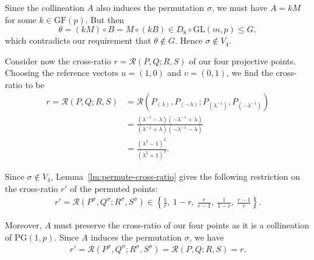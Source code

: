 \documentclass[ALCO, Unicode]{cedram}
\newcommand{\GF}{\mathrm{GF}}
\newcommand{\GL}{\mathrm{GL}}
\newcommand{\PG}{\mathrm{PG}}
\begin{document}
Since the collineation $A$ also induces the permutation $\sigma$, we must have $A = kM$ for some $k \in \GF{\left(p \right)}$. But then
\begin{displaymath}
\theta = \left(kM \right) \circ B = M \circ \left(kB \right) \in D_8 \circ \GL{\left(m, p \right)} \leqslant G,
\end{displaymath}
which contradicts our requirement that $\theta \notin G$. Hence $\sigma \notin V_4$.

Consider now the cross-ratio $r = \mathcal{R}{\left(P, Q; R, S \right)}$ of our four projective points. Choosing the reference vectors $u = \left(1, 0 \right)$ and $v = \left(0, 1 \right)$, we find the cross-ratio to be
\begin{align*}
r = \mathcal{R}{\left(P, Q; R, S \right)} &= \mathcal{R}{\left(P_{\left(\lambda \right)}, P_{\left(-\lambda \right)}; P_{\left(\lambda^{-1} \right)}, P_{\left(-\lambda^{-1} \right)}\right)} \\
&= \frac{\left(\lambda^{-1} - \lambda \right) \left(-\lambda^{-1} + \lambda \right)}{\left(\lambda^{-1} + \lambda \right) \left(-\lambda^{-1} - \lambda \right)} \\
&= \frac{\left(\lambda^2 - 1 \right)^2}{\left(\lambda^2 + 1 \right)^2}.
\end{align*}

Since $\sigma \notin V_4$, Lemma~\ref{lm:permute-cross-ratio} gives the following restriction on the cross-ratio $r'$ of the permuted points:
\begin{align} \label{eqn:cross-ratio-possibilities}
r' = \mathcal{R}{\left(P^\sigma, Q^\sigma; R^\sigma, S^\sigma \right)} \in {\left\{\frac{1}{r},\ 1-r,\ \frac{r}{r-1},\ \frac{1}{1-r},\ \frac{r-1}{r} \right\}}.
\end{align}

Moreover, $A$ must preserve the cross-ratio of our four points as it is a collineation of $\PG{\left(1, p \right)}$. Since $A$ induces the permutation $\sigma$, we have
\begin{align} \label{eqn:cross-ratio-preserved}
r' = \mathcal{R}{\left(P^\sigma, Q^\sigma; R^\sigma, S^\sigma \right)} = \mathcal{R}{\left(P, Q; R, S \right)} = r.
\end{align}
\end{document}
